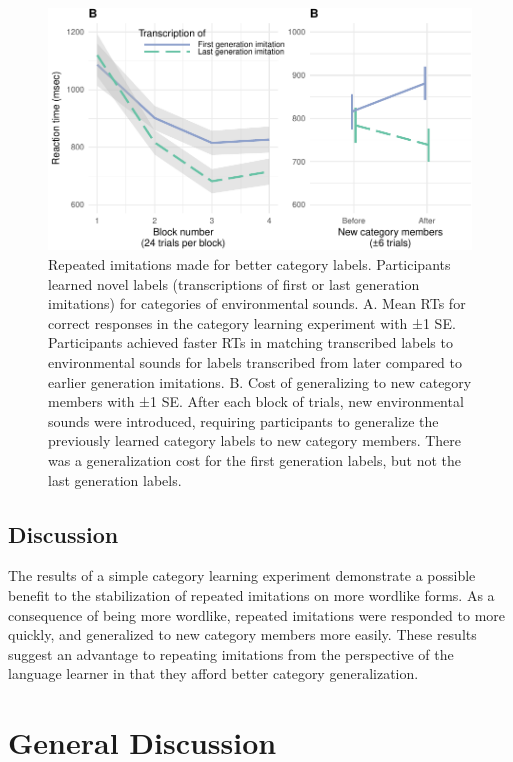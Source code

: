 \documentclass[english,floatsintext,man]{apa6}
\theoremstyle{definition}
\theoremstyle{definition}
\theoremstyle{remark}
\begin{document}
\begin{figure}
\centering
\includegraphics{fig6-1.pdf}
\caption{\label{fig:fig6}Repeated imitations made for better category
labels. Participants learned novel labels (transcriptions of first or
last generation imitations) for categories of environmental sounds. A.
Mean RTs for correct responses in the category learning experiment with
±1 SE. Participants achieved faster RTs in matching transcribed labels
to environmental sounds for labels transcribed from later compared to
earlier generation imitations. B. Cost of generalizing to new category
members with ±1 SE. After each block of trials, new environmental sounds
were introduced, requiring participants to generalize the previously
learned category labels to new category members. There was a
generalization cost for the first generation labels, but not the last
generation labels.}
\end{figure}

\subsection{Discussion}\label{discussion-2}

The results of a simple category learning experiment demonstrate a
possible benefit to the stabilization of repeated imitations on more
wordlike forms. As a consequence of being more wordlike, repeated
imitations were responded to more quickly, and generalized to new
category members more easily. These results suggest an advantage to
repeating imitations from the perspective of the language learner in
that they afford better category generalization.

\section{General Discussion}\label{general-discussion}
\end{document}
